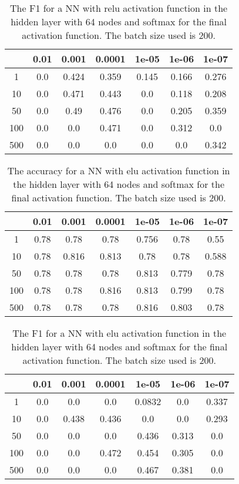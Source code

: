 \documentclass[uio,jmp,amsmath,amssymb,reprint,nofootinbib]{revtex4-1}
\numberwithin{equation}{section}
\begin{document}
\begin{table}[H]
\caption{The F1 for a NN with relu activation function in the hidden layer with 64 nodes and softmax for the final activation function. The batch size used is 200.}
\begin{tabular}{|c|c|c|c|c|c|c|}\hline
  & 0.01 & 0.001 & 0.0001 & 1e-05 & 1e-06 & 1e-07 \\ \hline
1 & 0.0 & 0.424 & 0.359 & 0.145 & 0.166 & 0.276 \\ \hline
10 & 0.0 & 0.471 & 0.443 & 0.0 & 0.118 & 0.208 \\ \hline
50 & 0.0 & 0.49 & 0.476 & 0.0 & 0.205 & 0.359 \\ \hline
100 & 0.0 & 0.0 & 0.471 & 0.0 & 0.312 & 0.0 \\ \hline
500 & 0.0 & 0.0 & 0.0 & 0.0 & 0.0 & 0.342 \\ \hline
\end{tabular}
\label{tab:14}
\end{table}


\begin{table}[H]
\caption{The accuracy for a NN with elu activation function in the hidden layer with 64 nodes and softmax for the final activation function. The batch size used is 200.}
\begin{tabular}{|c|c|c|c|c|c|c|}\hline
  & 0.01 & 0.001 & 0.0001 & 1e-05 & 1e-06 & 1e-07 \\ \hline
1 & 0.78 & 0.78 & 0.78 & 0.756 & 0.78 & 0.55 \\ \hline
10 & 0.78 & 0.816 & 0.813 & 0.78 & 0.78 & 0.588 \\ \hline
50 & 0.78 & 0.78 & 0.78 & 0.813 & 0.779 & 0.78 \\ \hline
100 & 0.78 & 0.78 & 0.816 & 0.813 & 0.799 & 0.78 \\ \hline
500 & 0.78 & 0.78 & 0.78 & 0.816 & 0.803 & 0.78 \\ \hline
\end{tabular}
\label{tab:15}
\end{table}

\begin{table}[H]
\caption{The F1 for a NN with elu activation function in the hidden layer with 64 nodes and softmax for the final activation function. The batch size used is 200.}
\begin{tabular}{|c|c|c|c|c|c|c|}\hline
  & 0.01 & 0.001 & 0.0001 & 1e-05 & 1e-06 & 1e-07 \\ \hline
1 & 0.0 & 0.0 & 0.0 & 0.0832 & 0.0 & 0.337 \\ \hline
10 & 0.0 & 0.438 & 0.436 & 0.0 & 0.0 & 0.293 \\ \hline
50 & 0.0 & 0.0 & 0.0 & 0.436 & 0.313 & 0.0 \\ \hline
100 & 0.0 & 0.0 & 0.472 & 0.454 & 0.305 & 0.0 \\ \hline
500 & 0.0 & 0.0 & 0.0 & 0.467 & 0.381 & 0.0 \\ \hline
\end{tabular}
\label{tab:16}
\end{table}
\end{document}
